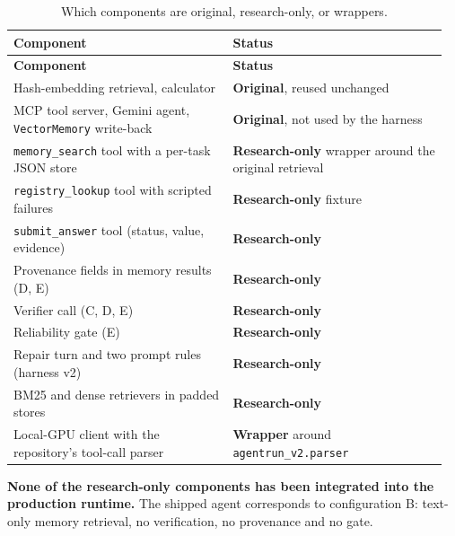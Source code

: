 \documentclass[10.5pt,a4paper,oneside]{report}
\begin{document}
\begingroup\small\setlength{\tabcolsep}{4pt}\renewcommand{\arraystretch}{1.18}
\begin{longtable}{>{\raggedright\arraybackslash}p{0.489\linewidth}>{\raggedright\arraybackslash}p{0.471\linewidth}}
\caption{Which components are original, research-only, or wrappers.}\\
\toprule
\textbf{Component} & \textbf{Status} \\
\midrule
\endfirsthead
\toprule
\textbf{Component} & \textbf{Status} \\
\midrule
\endhead
\bottomrule
\endlastfoot
Hash-embedding retrieval, calculator & \textbf{Original}, reused unchanged \\
MCP tool server, Gemini agent, \texttt{VectorMemory} write-back & \textbf{Original}, not used by the harness \\
\texttt{memory\_\allowbreak{}search} tool with a per-task JSON store & \textbf{Research-only} wrapper around the original retrieval \\
\texttt{registry\_\allowbreak{}lookup} tool with scripted failures & \textbf{Research-only} fixture \\
\texttt{submit\_\allowbreak{}answer} tool (status, value, evidence) & \textbf{Research-only} \\
Provenance fields in memory results (D, E) & \textbf{Research-only} \\
Verifier call (C, D, E) & \textbf{Research-only} \\
Reliability gate (E) & \textbf{Research-only} \\
Repair turn and two prompt rules (harness v2) & \textbf{Research-only} \\
BM25 and dense retrievers in padded stores & \textbf{Research-only} \\
Local-GPU client with the repository's tool-call parser & \textbf{Wrapper} around \texttt{agentrun\_\allowbreak{}v2.\allowbreak{}parser} \\
\end{longtable}
\endgroup

\textbf{None of the research-only components has been integrated into the production runtime.} The shipped agent corresponds to configuration B: text-only memory retrieval, no verification, no provenance and no gate.
\end{document}
